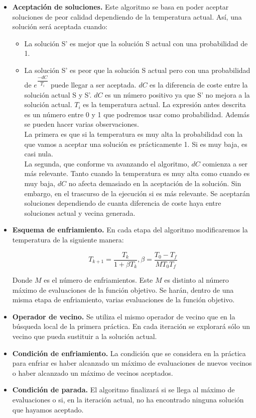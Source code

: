 \begin{itemize}
	\item \textbf{Aceptación de soluciones.} Este algoritmo se basa en poder aceptar soluciones de peor calidad dependiendo de la temperatura actual. Así, una solución será aceptada cuando:\\
	
	\begin{itemize}
		\item La solución S' es mejor que la solución S actual con una probabilidad de 1.
		\item La solución S' es peor que la solución S actual pero con una probabilidad de $ e^{\dfrac{-dC}{T_i}}$ puede llegar a ser aceptada. $dC$ es la diferencia de coste entre la solución actual S y S'. $dC$ es un número positivo ya que S' no mejora a la solución actual. $T_i$ es la temperatura actual. La expresión antes descrita es un número entre 0 y 1 que podremos usar como probabilidad. Además se pueden hacer varias observaciones.\\
		
		La primera es que si la temperatura es muy alta la probabilidad con la que vamos a aceptar una solución es prácticamente 1. Si es muy baja, es casi nula. \\
		
		La segunda, que conforme va avanzando el algoritmo, $dC$ comienza a ser más relevante. Tanto cuando la temperatura es muy alta como cuando es muy baja, $dC$ no afecta demasiado en la aceptación de la solución. Sin embargo, en el trascurso de la ejecución si es más relevante. Se aceptarán soluciones dependiendo de cuanta diferencia de coste haya entre soluciones actual y vecina generada.
	
	\end{itemize}
	\item \textbf{Esquema de enfriamiento.} En cada etapa del algoritmo modificaremos la temperatura de la siguiente manera:
	
	\[T_{k+1}=\dfrac{T_k}{1+\beta T_{k}},\beta = \dfrac{T_0-T_f}{MT_0T_f} \]
	 
	 Donde $M$ es el número de enfriamientos. Este $M$ es distinto al número máximo de evaluaciones de la función objetivo. Se harán, dentro de una misma etapa de enfriamiento, varias evaluaciones de la función objetivo.
	 
	 \item \textbf{Operador de vecino.} Se utiliza el mismo operador de vecino que en la búsqueda local de la primera práctica. En cada iteración se explorará sólo un vecino que pueda sustituir a la solución actual.
	 
	 \item \textbf{Condición de enfriamiento.} La condición que se considera en la práctica para enfriar es haber alcanzado un máximo de evaluaciones de nuevos vecinos o haber alcanzado un máximo de vecinos aceptados.
	 
	 \item \textbf{Condición de parada.} El algoritmo finalizará si se llega al máximo de evaluaciones o si, en la iteración actual, no ha encontrado ninguna solución que hayamos aceptado.
	
	
\end{itemize}

